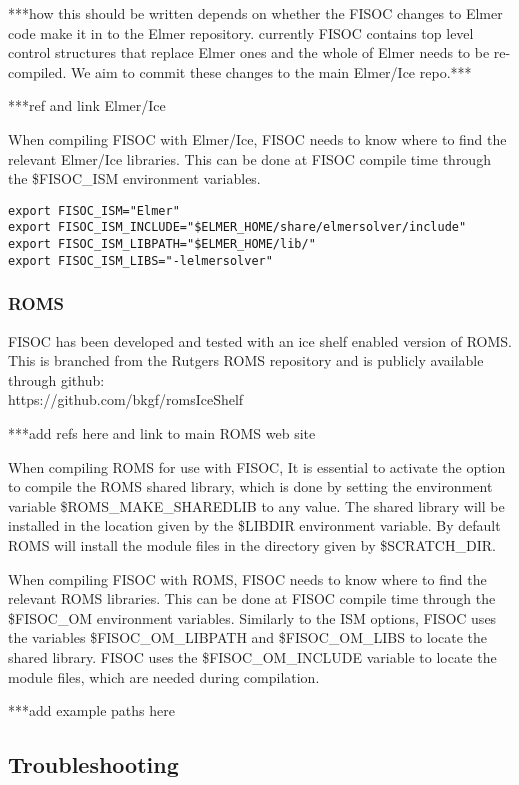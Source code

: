 \documentclass[12pt]{article}
\begin{document}
***how this should be written depends on whether the FISOC changes to 
Elmer code make it in to the Elmer repository. currently FISOC contains 
top level control structures that replace Elmer ones and the whole of 
Elmer needs to be re-compiled.  We aim to commit these changes to the 
main Elmer/Ice repo.***

***ref and link Elmer/Ice

When compiling FISOC with Elmer/Ice, FISOC needs to know where to 
find the relevant Elmer/Ice libraries.  
This can be done at FISOC compile time through the 
\$FISOC\_ISM
environment variables.  


\begin{lstlisting}
export FISOC_ISM="Elmer"
export FISOC_ISM_INCLUDE="$ELMER_HOME/share/elmersolver/include"
export FISOC_ISM_LIBPATH="$ELMER_HOME/lib/"
export FISOC_ISM_LIBS="-lelmersolver"
\end{lstlisting}

\subsubsection{ROMS}
\label{sec:PreReqROMS}

FISOC has been developed and tested with an ice shelf enabled version of ROMS. 
This is branched from the Rutgers ROMS repository and is publicly available 
through github: \\
https://github.com/bkgf/romsIceShelf

***add refs here and link to main ROMS web site

When compiling ROMS for use with FISOC, It is essential to activate the option 
to compile the ROMS shared library, which 
is done by setting the environment variable \$ROMS\_MAKE\_SHAREDLIB to any value. 
The shared library will be installed in the location given by the 
 \$LIBDIR environment variable. 
By default ROMS will install the module files in the directory given by 
 \$SCRATCH\_DIR.  

When compiling FISOC with ROMS, FISOC needs to know where to 
find the relevant ROMS libraries.  
This can be done at FISOC compile time through the 
\$FISOC\_OM
environment variables.  
Similarly to the ISM options, FISOC uses the variables \$FISOC\_OM\_LIBPATH and
 \$FISOC\_OM\_LIBS to locate the shared library.
FISOC uses the  \$FISOC\_OM\_INCLUDE variable to locate the module files, 
which are needed during compilation.

***add example paths here

\subsection{Troubleshooting}
\end{document}
